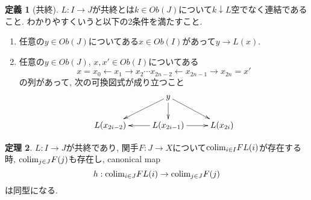 \documentclass[dvipdfmx,a4paper,11pt]{report}
\newcommand{\colim}{{\rm colim}}
\theoremstyle{definition}
\newtheorem{thm}{定理}
\newtheorem{dfn}[thm]{定義}
\begin{document}
 \begin{tcolorbox}
 [colback = white, colframe = green!35!black, fonttitle = \bfseries,breakable = true]
\begin{dfn}[共終]
\label{dfn-cofiinal-category}
$L : I \to J$が共終とは$k \in Ob(J)$について$k \downarrow L$空でなく連結であること.
わかりやすくいうと以下の2条件を満たすこと.
\begin{enumerate}
\item 任意の$y\in Ob(J)$についてある$x \in Ob(I)$があって$y \to L(x)$.
\item  任意の$y\in Ob(J)$, $x, x' \in Ob(I)$についてある
$$
x=x_0 \leftarrow x_1 \to x_2 \cdots x_{2n-2} \leftarrow x_{2n-1} \to x_{2n}=x'
$$
の列があって, 次の可換図式が成り立つこと
\begin{equation*}
\xymatrix@C=25pt@R=20pt{
& y\ar@{->}[ld]\ar@{->}[d]\ar@{->}[rd]
&
\\
L(x_{2i-2})
&L(x_{2i-1})\ar@{->}[l]\ar@{->}[r]
&L(x_{2i}) \\   
}
\end{equation*}
\end{enumerate}
\end{dfn}
\end{tcolorbox}

 \begin{tcolorbox}
 [colback = white, colframe = green!35!black, fonttitle = \bfseries,breakable = true]
\begin{thm}
\label{thm-cofinal-commute}
$L : I \to J$が共終であり, 関手$F : J \to X$について$\colim_{i\in I}FL(i)$が存在する時, 
$\colim_{j \in J} F(j)$も存在し, canonical map
$$
h : \colim_{i \in J}FL(i) \to \colim_{j \in J} F(j)
$$
は同型になる. 
\end{thm}
\end{tcolorbox}
\end{document}
